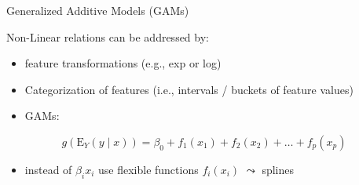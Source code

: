 \documentclass[11pt,compress,t,notes=noshow, aspectratio=169, xcolor=table]{beamer}
\begin{document}

\begin{frame}{Generalized Additive Models (GAMs)}

Non-Linear relations can be addressed by:
    \begin{itemize}
        \item feature transformations (e.g., exp or log)
        \item Categorization of features (i.e., intervals / buckets of feature values)
        \item GAMs:
    \end{itemize}
    
    $$g(\mathrm{E}_Y (y\mid x)) = \beta_0 + f_1(x_1) + f_2(x_2) + \ldots + f_p(x_p)$$
    
    \begin{itemize}
        \item instead of $\beta_i x_i$ use flexible functions $f_i(x_i)$ $\leadsto$ splines
    \end{itemize}

\end{frame}

\end{document}

